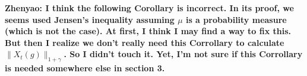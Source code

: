 \documentclass[12pt,oneside,english]{amsart}
\theoremstyle{plain}
\theoremstyle{definition}
\numberwithin{equation}{section}
\begin{document}
\textbf{ Zhenyao: I think the following Corollary is incorrect. In its proof, we seems used Jensen's inequality assuming $\mu$ is a probability measure (which is not the case). At first, I think I may find a way to fix this. But then I realize we don't really need this Corrollary to calculate $\|X_t(g)\|_{1+\gamma}$. So I didn't touch it. Yet, I'm not sure if this Corrollary is needed somewhere else in section 3.}
\end{document}

